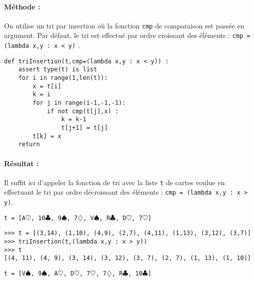 \noindent\begin{minipage}[t]{4.5cm}
\paragraph{Méthode :} On utilise un tri par insertion où la fonction \texttt{cmp}
de comparaison est passée en argument. Par défaut, le tri est effectué par ordre croissant 
des éléments :
\texttt{cmp = (lambda x,y : x < y)} .
\end{minipage}
\hfill
\begin{minipage}[t]{11cm}\footnotesize
\begin{lstlisting}
def triInsertion(t,cmp=(lambda x,y : x < y)) :
    assert type(t) is list
    for i in range(1,len(t)):
        x = t[i]
        k = i
        for j in range(i-1,-1,-1):
            if not cmp(t[j],x) :
                k = k-1
                t[j+1] = t[j]
        t[k] = x
    return
\end{lstlisting}
\end{minipage}

\paragraph{Résultat :} Il suffit ici d'appeler la fonction de tri avec la liste \texttt{t} de cartes voulue
en effectuant le tri par ordre décroissant des éléments : \texttt{cmp = (lambda x,y : x > y)}.
\vspace*{3mm}

\noindent \texttt{t = [A$\heartsuit$, 10$\clubsuit$, 9$\spadesuit$, 7$\diamondsuit$, V$\spadesuit$, R$\clubsuit$, D$\heartsuit$, 7$\heartsuit$]}
\begin{Verbatim}
>>> t = [(3,14), (1,10), (4,9), (2,7), (4,11), (1,13), (3,12), (3,7)]
>>> triInsertion(t,(lambda x,y : x > y))
>>> t
[(4, 11), (4, 9), (3, 14), (3, 12), (3, 7), (2, 7), (1, 13), (1, 10)]
\end{Verbatim}
\texttt{t = [V$\spadesuit$, 9$\spadesuit$, A$\heartsuit$, D$\heartsuit$, 7$\heartsuit$, 7$\diamondsuit$, R$\clubsuit$, 10$\clubsuit$]}

